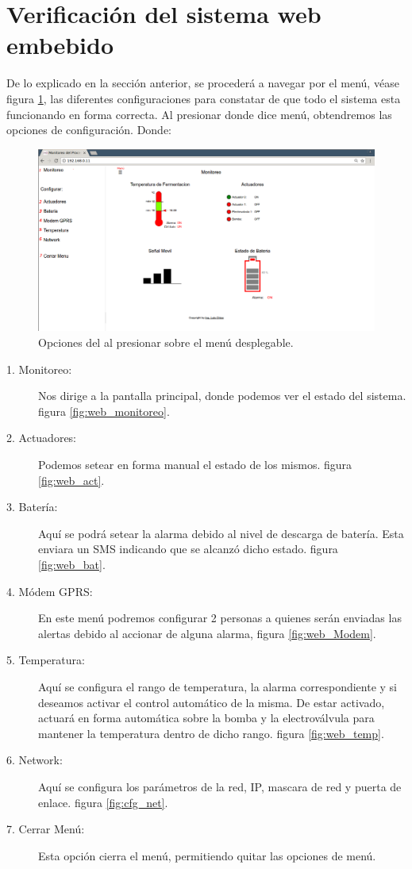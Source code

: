 \section{Verificación del sistema web embebido} 
De lo explicado en la sección anterior, se procederá a navegar por el menú, véase figura \ref{fig:web_menus_num}, las diferentes configuraciones para constatar de que todo el sistema esta funcionando en forma correcta. Al presionar donde dice menú, obtendremos las opciones de configuración. Donde:

\begin{figure}[h]
  \centering
  \includegraphics[scale=.25]{./Figures/web_menus_num.png}
  \caption{Opciones del al presionar sobre el menú desplegable.}
  \label{fig:web_menus_num}
\end{figure}



\begin{description}
  \item[1. Monitoreo:] Nos dirige a la pantalla principal, donde podemos ver el estado del sistema. figura \ref{fig:web_monitoreo}.
  \item[2. Actuadores:] Podemos setear en forma manual el estado de los mismos. figura \ref{fig:web_act}.
  \item[3. Batería:] Aquí se podrá setear la alarma debido al nivel de descarga de batería. Esta enviara un SMS indicando que se alcanzó dicho estado. figura \ref{fig:web_bat}.
  \item[4. Módem GPRS:] En este menú podremos configurar 2 personas a quienes serán enviadas las alertas debido al accionar de alguna alarma, figura \ref{fig:web_Modem}.
  \item[5. Temperatura:] Aquí se configura el rango de temperatura, la alarma correspondiente y si deseamos activar el control automático de la misma. De estar activado, actuará en forma automática sobre la bomba y la electroválvula para mantener la temperatura dentro de dicho rango. figura \ref{fig:web_temp}.
  \item[6. Network:] Aquí se configura los parámetros de la red, IP, mascara de red y puerta de enlace. figura \ref{fig:cfg_net}.
  \item[7. Cerrar Menú:] Esta opción cierra el menú, permitiendo quitar las opciones de menú.
\end{description}

